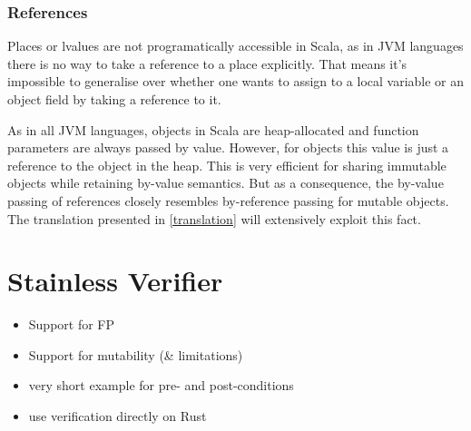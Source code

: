 \subsubsection{References}

Places or lvalues are not programatically accessible in Scala, as in JVM
languages there is no way to take a reference to a place explicitly. That means
it's impossible to generalise over whether one wants to assign to a local
variable or an object field by taking a reference to it.

As in all JVM languages, objects in Scala are heap-allocated and function
parameters are always passed by value. However, for objects this value is just a
reference to the object in the heap. This is very efficient for sharing
immutable objects while retaining by-value semantics. But as a consequence, the
by-value passing of references closely resembles by-reference passing for
mutable objects. The translation presented in \autoref{translation} will
extensively exploit this fact.

\section{Stainless Verifier}

\begin{itemize}
  \item Support for FP
  \item Support for mutability (\& limitations)

  \item very short example for pre- and post-conditions
  \item use verification directly on Rust
\end{itemize}
